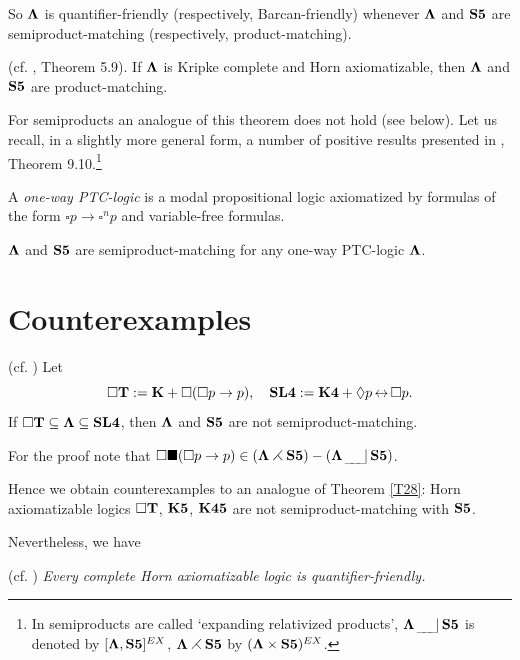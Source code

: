 \documentclass[twoside]{aiml20}
\def\BT{{\bf T}}
\def\bsq{\blacksquare}
\def\Di{\Diamond}
\def\ri{\rightarrow}
\def\BK{{\bf K}}
\def\sqr{\square}
\def\bLa{{\bf \Lambda}}
\def\sem0{\,_{\_\!\_\!\_}\!|\,}
\def\sem{\,_{\_\!\_\!\_}\!|\,\bS5}
\def\rtt{\rightthreetimes}
\def\bSL4{{\bf SL4}}
\def\bbK4{{\bf K4}}
\def\bLa{{\bf \Lambda}}
\def\bS5{{\bf S5}}
\def\Di{\Diamond}
\def\ri{\rightarrow}
\def\sbq{\subseteq}
\def\sqr{\square}
\def\ti{\times}
\def\lrarr{{\leftrightarrow}}
\begin{document}
{So $\bLa$ is quantifier-friendly (respectively, Barcan-friendly)
whenever $\bLa$ and $\bS5$ are semiproduct-matching (respectively, product-matching).

\begin{theorem}\label{T28} (cf. \cite{GKWZ}, Theorem 5.9).  If $\bLa$ is Kripke
  complete and Horn axiomatizable, then $\bLa$ and $\bS5$ are
  product-matching.
\end{theorem}

For semiproducts an analogue of this theorem does not hold (see below). Let us recall, in a
slightly more general form, a number of positive results presented in
\cite{GKWZ}, Theorem 9.10.\footnote{In \cite{GKWZ} semiproducts are called
  `expanding relativized products', $\bLa\sem$ is denoted by
  $[\bLa,\bS5]^{EX}$, $\bLa\rtt\bS5$ by $(\bLa\ti\bS5)^{EX}$.}

\begin{definition}
A {\em one-way PTC-logic} is a modal propositional logic axiomatized by formulas of the form $\sqr p\ri\sqr^n p$ and variable-free formulas. 
\end{definition}

\begin{theorem}\label{T6} 
$\bLa$ and $\bS5$ are semiproduct-matching for any one-way PTC-logic $\bLa$.
\end{theorem}


\section{Counterexamples}

\begin{theorem}(cf. \cite{P45SS2})
Let
$$\sqr\BT:=\BK+\sqr(\sqr p\ri p), \quad
\bSL4:=\bbK4+\Di p\,\lrarr\,\sqr p.$$
If $\sqr\BT\sbq\bLa\sbq\bSL4$, then $\bLa$ and $\bS5$ are not
semiproduct-matching.
\end{theorem}

For the proof note that
$\sqr\bsq(\sqr p\ri p)\in(\bLa\rtt \bS5)-(\bLa\sem)$.

\smallskip
Hence we obtain counterexamples to an analogue of Theorem \ref{T28}: Horn axiomatizable logics $\sqr\BT$, ${\bf K5}$, ${\bf K45}$ are not  semiproduct-matching with $\bS5$.

Nevertheless, we have

\begin{remark}
  (cf. \cite{P48abs4}) {\em Every complete Horn axiomatizable logic is quantifier-friendly.}
\end{remark}

}
\end{document}

